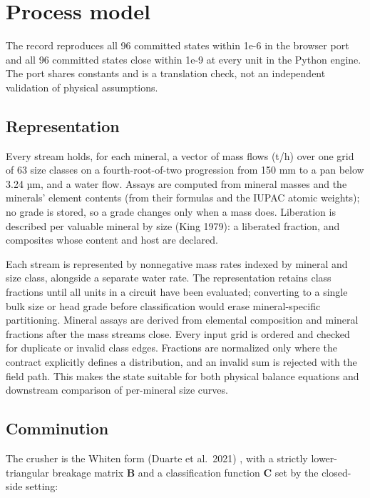\documentclass[10pt]{article}
\begin{document}
\section{Process model}\label{process-model}

The record reproduces all 96 committed states within 1e-6 in the browser
port and all 96 committed states close within 1e-9 at every unit in the
Python engine. The port shares constants and is a translation check, not
an independent validation of physical assumptions.

\subsection{Representation}\label{representation}

Every stream holds, for each mineral, a vector of mass flows (t/h) over
one grid of 63 size classes on a fourth-root-of-two progression from 150
mm to a pan below 3.24 µm, and a water flow. Assays are computed from
mineral masses and the minerals' element contents (from their formulas
and the IUPAC atomic weights); no grade is stored, so a grade changes
only when a mass does. Liberation is described per valuable mineral by
size (King 1979): a liberated fraction, and composites whose content and
host are declared.

Each stream is represented by nonnegative mass rates indexed by mineral
and size class, alongside a separate water rate. The representation
retains class fractions until all units in a circuit have been
evaluated; converting to a single bulk size or head grade before
classification would erase mineral-specific partitioning. Mineral assays
are derived from elemental composition and mineral fractions after the
mass streams close. Every input grid is ordered and checked for
duplicate or invalid class edges. Fractions are normalized only where
the contract explicitly defines a distribution, and an invalid sum is
rejected with the field path. This makes the state suitable for both
physical balance equations and downstream comparison of per-mineral size
curves.

\subsection{Comminution}\label{comminution}

The crusher is the Whiten form (Duarte et al.~2021) \cite{duarte2021},
with a strictly lower-triangular breakage matrix \(\mathbf{B}\) and a
classification function \(\mathbf{C}\) set by the closed-side setting:
\end{document}

